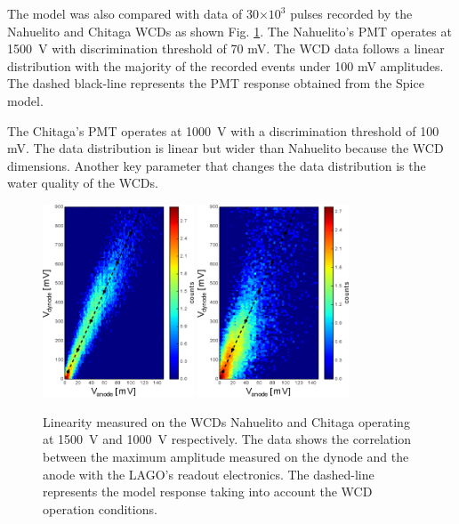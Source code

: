 \documentclass[letterpaper, 10 pt, conference]{ieeeconf}  %
\begin{document}
The model was also compared with data of 30$\times 10^3$ pulses recorded by the Nahuelito and Chitaga WCDs as shown Fig. \ref{Nahuelito_Chitaga}. The Nahuelito's PMT operates at 1500~V with discrimination threshold of 70 mV. The WCD data follows a linear distribution with the majority of the recorded events under 100 mV amplitudes. The dashed black-line represents the PMT response obtained from the Spice model.

The Chitaga's PMT operates at 1000~V with a discrimination threshold of 100 mV. The data distribution is linear but wider than Nahuelito because the WCD dimensions. Another key parameter that changes the data distribution is the water quality of the WCDs.

\begin{figure}[h!]
\begin{center}
\includegraphics[width=0.4\textwidth]{Figures/Nahuelito.eps}
\includegraphics[width=0.4\textwidth]{Figures/Chitaga.eps}
\caption{Linearity measured on the WCDs Nahuelito and Chitaga operating at 1500~V and 1000~V respectively. The data shows the correlation between the maximum amplitude measured on the dynode and the anode with the LAGO's readout electronics. The dashed-line represents the model response taking into account the WCD operation conditions.}
\label{Nahuelito_Chitaga}
\end{center}
\end{figure}
\end{document}
